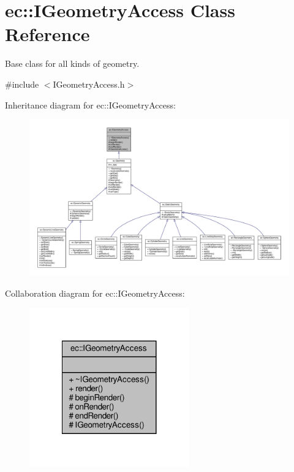 \hypertarget{classec_1_1_i_geometry_access}{}\section{ec\+:\+:I\+Geometry\+Access Class Reference}
\label{classec_1_1_i_geometry_access}


Base class for all kinds of geometry.  




{\ttfamily \#include $<$I\+Geometry\+Access.\+h$>$}



Inheritance diagram for ec\+:\+:I\+Geometry\+Access\+:\nopagebreak
\begin{figure}[H]
\begin{center}
\leavevmode
\includegraphics[width=350pt]{classec_1_1_i_geometry_access__inherit__graph}
\end{center}
\end{figure}


Collaboration diagram for ec\+:\+:I\+Geometry\+Access\+:\nopagebreak
\begin{figure}[H]
\begin{center}
\leavevmode
\includegraphics[width=196pt]{classec_1_1_i_geometry_access__coll__graph}
\end{center}
\end{figure}
